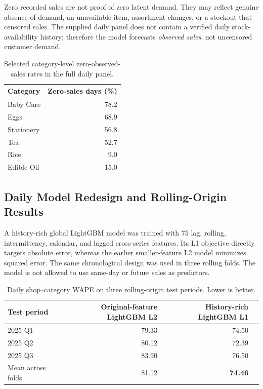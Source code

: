 Zero recorded sales are not proof of zero latent demand. They may reflect genuine absence of demand, an unavailable item, assortment changes, or a stockout that censored sales. The supplied daily panel does not contain a verified daily stock-availability history; therefore the model forecasts \emph{observed sales}, not uncensored customer demand.

\begin{table}[htbp]\centering\small
\caption{Selected category-level zero-observed-sales rates in the full daily panel.}
\begin{tabular}{lr}\toprule
Category & Zero-sales days (\%)\\\midrule
Baby Care & 78.2\\
Eggs & 68.9\\
Stationery & 56.8\\
Tea & 52.7\\
Rice & 9.0\\
Edible Oil & 15.0\\\bottomrule
\end{tabular}
\end{table}

\subsection{Daily Model Redesign and Rolling-Origin Results}

A history-rich global LightGBM model was trained with 75 lag, rolling, intermittency, calendar, and lagged cross-series features. Its L1 objective directly targets absolute error, whereas the earlier smaller-feature L2 model minimizes squared error. The same chronological design was used in three rolling folds. The model is not allowed to use same-day or future sales as predictors.

\begin{table}[htbp]\centering\small
\caption{Daily shop--category WAPE on three rolling-origin test periods. Lower is better.}
\begin{tabular}{lrrr}\toprule
Test period & Original-feature LightGBM L2 & History-rich LightGBM L1\\\midrule
2025 Q1 & 79.33 & 74.50\\
2025 Q2 & 80.12 & 72.39\\
2025 Q3 & 83.90 & 76.50\\
Mean across folds & 81.12 & \textbf{74.46}\\\bottomrule
\end{tabular}
\end{table}

